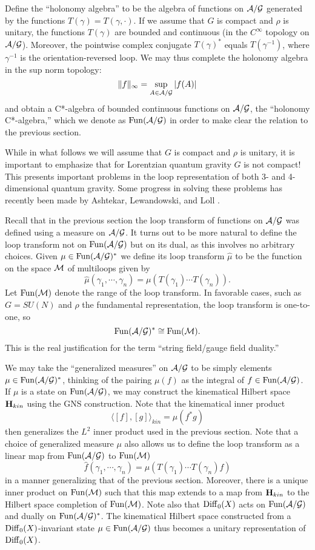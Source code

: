 \documentclass[12pt]{article}
\newcommand{\A}{{\cal A}}
\newcommand{\G}{{\cal G}}
\newcommand{\M}{{\cal M}}
\renewcommand{\H}{{\bf H}}
\newcommand{\Diff}{{\rm Diff}}
\newcommand{\Fun}{{\rm Fun}}
\begin{document}
Define the ``holonomy algebra'' to be the algebra of functions on
$\A/\G$ generated by the functions $T(\gamma) = T(\gamma,\cdot)$.
If we assume that $G$ is compact and $\rho$ is unitary, the functions
$T(\gamma)$ are bounded and continuous (in the $C^\infty$ topology on
$\A/\G$).  Moreover, the pointwise complex conjugate $T(\gamma)^\ast$ equals
$T(\gamma^{-1})$, where $\gamma^{-1}$ is the orientation-reversed
loop.  We may thus complete the holonomy algebra in the sup norm topology:
\[          \|f\|_\infty = \sup_{A \in \A/\G} |f(A)|  \]
and obtain a C*-algebra of bounded continuous functions on $\A/\G$,
the ``holonomy C*-algebra,'' which we denote as $\Fun(\A/\G)$ in order
to make clear the relation to the previous section.

While in what follows we will assume that $G$ is compact and $\rho$ is
unitary, it is important to emphasize that  for Lorentzian quantum gravity
$G$ is not compact!  This presents important problems in the loop
representation of both 3- and  4-dimensional quantum gravity.   Some
progress in solving these problems has recently been made by Ashtekar,
Lewandowski, and Loll \cite{AL,ALoll,Loll}.

Recall that in the previous section the loop transform of functions on
$\A/\G$ was defined using a measure on $\A/\G$.
It turns out to be more natural to define the loop transform not on
$\Fun(\A/\G)$ but on its dual, as this involves no arbitrary choices.
Given $\mu \in \Fun(\A/\G)^\ast$ we define its loop transform
$\hat\mu$ to be the function on the space $\M$ of multiloops given by
\[        \hat\mu(\gamma_1, \cdots, \gamma_n) =
 \mu(T(\gamma_1) \cdots T(\gamma_n))  .\]
Let $\Fun(\M)$ denote the range of the loop transform.  In favorable
cases, such as $G = SU(N)$ and $\rho$ the fundamental representation,
the loop transform is one-to-one, so
\[  \Fun(\A/\G)^\ast \cong \Fun(\M). \]
This is the real justification for the term ``string field/gauge field
duality.''

We may take the ``generalized measures'' on $\A/\G$ to be simply
elements $\mu \in \Fun(\A/\G)^\ast$, thinking of the pairing $\mu(f)$ as
the integral of $f \in \Fun(\A/\G)$.  If $\mu$ is a state on $\Fun(\A/\G)$, we
may construct the kinematical Hilbert space $\H_{kin}$
using the GNS construction.  Note that the kinematical
inner product
\[          \langle [f], [g] \rangle_{kin} = \mu(f^\ast g)  \]
then generalizes the $L^2$ inner product used in
the previous section.  Note that a choice of generalized measure $\mu$
also allows us to define the loop transform as a linear map from
$\Fun(\A/\G)$ to $\Fun(\M)$
\[        \hat f(\gamma_1, \cdots, \gamma_n) =
\mu(T(\gamma_1) \cdots T(\gamma_n)f)  \]
in a manner generalizing that of the previous section.  Moreover,
there is a unique inner product on $\Fun(\M)$ such that this map
extends to a map from $\H_{kin}$ to the Hilbert space completion of
$\Fun(\M)$.
Note also that $\Diff_0(X)$ acts on $\Fun(\A/\G)$
and dually on $\Fun(\A/\G)^\ast$.  The kinematical Hilbert space
constructed from a $\Diff_0(X)$-invariant state $\mu \in \Fun(\A/\G)$
thus becomes a unitary representation of $\Diff_0(X)$.
\end{document}

